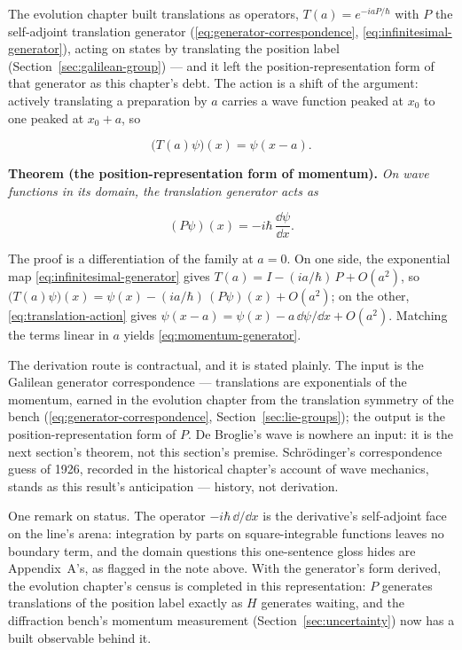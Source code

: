 The evolution chapter built translations as operators, $T(a) = e^{-iaP/\hbar}$ with $P$ the self-adjoint translation generator (\eqref{eq:generator-correspondence}, \eqref{eq:infinitesimal-generator}), acting on states by translating the position label (Section~\ref{sec:galilean-group}) --- and it left the position-representation form of that generator as this chapter's debt. The action is a shift of the argument: actively translating a preparation by $a$ carries a wave function peaked at $x_0$ to one peaked at $x_0 + a$, so
\begin{linenomath}
    \begin{equation}
        \bigl(T(a)\psi\bigr)(x) = \psi(x - a) .
        \label{eq:translation-action}
    \end{equation}
\end{linenomath}

\medskip\noindent\textbf{Theorem (the position-representation form of momentum).} \emph{On wave functions in its domain, the translation generator acts as}
\begin{linenomath}
    \begin{equation}
        (P\psi)(x) = -i\hbar\,\frac{\dd\psi}{\dd x} .
        \label{eq:momentum-generator}
    \end{equation}
\end{linenomath}
The proof is a differentiation of the family at $a = 0$. On one side, the exponential map \eqref{eq:infinitesimal-generator} gives $T(a) = I - (ia/\hbar)\,P + O(a^2)$, so $\bigl(T(a)\psi\bigr)(x) = \psi(x) - (ia/\hbar)\,(P\psi)(x) + O(a^2)$; on the other, \eqref{eq:translation-action} gives $\psi(x - a) = \psi(x) - a\,\dd\psi/\dd x + O(a^2)$. Matching the terms linear in $a$ yields \eqref{eq:momentum-generator}.

The derivation route is contractual, and it is stated plainly. The input is the Galilean generator correspondence --- translations are exponentials of the momentum, earned in the evolution chapter from the translation symmetry of the bench (\eqref{eq:generator-correspondence}, Section~\ref{sec:lie-groups}); the output is the position-representation form of $P$. De Broglie's wave is nowhere an input: it is the next section's theorem, not this section's premise. Schr\"odinger's correspondence guess of 1926, recorded in the historical chapter's account of wave mechanics, stands as this result's anticipation --- history, not derivation.

One remark on status. The operator $-i\hbar\,\dd/\dd x$ is the derivative's self-adjoint face on the line's arena: integration by parts on square-integrable functions leaves no boundary term, and the domain questions this one-sentence gloss hides are Appendix~A's, as flagged in the note above. With the generator's form derived, the evolution chapter's census is completed in this representation: $P$ generates translations of the position label exactly as $H$ generates waiting, and the diffraction bench's momentum measurement (Section~\ref{sec:uncertainty}) now has a built observable behind it.

